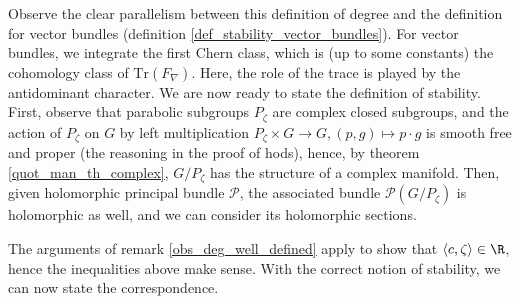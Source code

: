 {Observe the clear parallelism between this definition of degree and the definition for vector bundles (definition \ref{def_stability_vector_bundles}). For vector bundles, we integrate the first Chern class, which is (up to some constants) the cohomology class of \(\mathrm{Tr}(F_\nabla)\). Here, the role of the trace is played by the antidominant character. We are now ready to state the definition of stability. First, observe that parabolic subgroups \(P_\zeta\) are complex closed subgroups, and the action of \(P_\zeta\) on \(G\) by left multiplication \(P_\zeta \times G \to G, (p,g) \mapsto p\cdot g \) is smooth free and proper (the reasoning in the proof of \parencite[Th. 21.17]{lee_introSM} hods), hence, by theorem \ref{quot_man_th_complex}, \(G/P_\zeta\) has the structure of a complex manifold. Then, given holomorphic principal bundle \(\mathcal{P}\), the associated bundle \(\mathcal{P}(G/P_\zeta)\) is holomorphic as well, and we can consider its holomorphic sections.

The arguments of remark \ref{obs_deg_well_defined} apply to show that \(\langle c, \zeta \rangle \in \R\), hence the inequalities above make sense. With the correct notion of stability, we can now state the correspondence.

}

